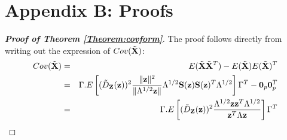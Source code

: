 \documentclass[fleqn,12pt]{article}
\begin{document}
\section*{Appendix B: Proofs}
\begin{proof}[\textbf{Proof of Theorem  \ref{Theorem:covform}}]
The proof follows directly from writing out the expression of $Cov ( \tilde {{\mathbf{X}}})$:
\begin{eqnarray*}
Cov(\tilde{{\mathbf{X}}}) &=& E(\tilde{{\mathbf{X}}} \tilde{{\mathbf{X}}}^T) - E(\tilde{{\mathbf{X}}}) E(\tilde{{\mathbf{X}}})^T\\
&=& \Gamma . E \left[ (\tilde D_{\mathbf{Z}}({\bf{z}}))^2 \frac{\|{\bf{z}}\|^2}{\| \Lambda^{1/2}{\bf{z}}\|} \Lambda^{1/2} {\mathbf{S}}({\bf{z}}) {\mathbf{S}}({\bf{z}})^T \Lambda^{1/2} \right] \Gamma^T - {\bf 0}_p {\bf 0}_p^T\\
&=& \Gamma .E \left[ (\tilde D_{\mathbf{Z}}({\bf{z}}))^2 \frac{\Lambda^{1/2} {\bf{z}} {\bf{z}}^T \Lambda^{1/2}}{{\bf{z}}^T \Lambda {\bf{z}}} \right] \Gamma^T
\end{eqnarray*}


\end{proof}
\end{document}
